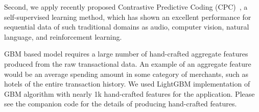\documentclass[sigconf, anonymous]{acmart}
\begin{document}
Second, we apply recently proposed Contrastive Predictive Coding (CPC)~\cite{DBLP:journals/corr/abs-1807-03748}, a self-supervised learning method, which has shown an excellent performance for sequential data of such traditional domains as audio, computer vision, natural language, and reinforcement learning. %

GBM based model requires a large number of hand-crafted aggregate features produced from the raw transactional data. An example of an aggregate feature would be an average spending amount in some category of merchants, such as hotels of the entire transaction history.
We used LightGBM\cite{NIPS2017_6907} implementation of GBM algorithm with nearly 1k hand-crafted features for the application. Please see the companion code for the details of producing hand-crafted features.

\end{document}
